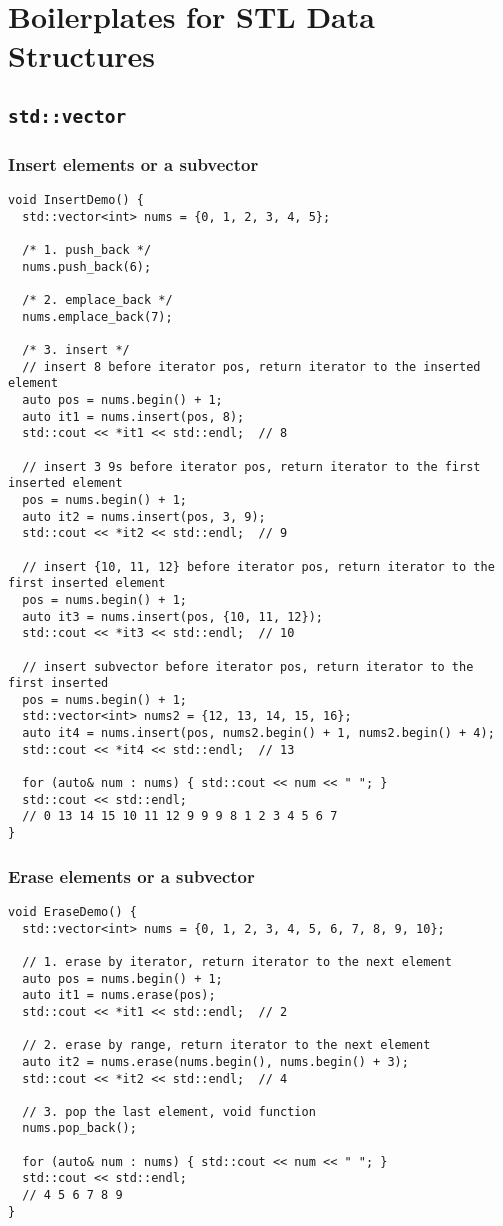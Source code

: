 \chapter{Boilerplates for STL Data Structures}
\section{{\colorbox{CodeBackground}{\lstinline|std::vector|}}}

\subsection{Insert elements or a subvector}
\begin{lstlisting}
void InsertDemo() {
  std::vector<int> nums = {0, 1, 2, 3, 4, 5};

  /* 1. push_back */
  nums.push_back(6);

  /* 2. emplace_back */
  nums.emplace_back(7);

  /* 3. insert */
  // insert 8 before iterator pos, return iterator to the inserted element
  auto pos = nums.begin() + 1;
  auto it1 = nums.insert(pos, 8);
  std::cout << *it1 << std::endl;  // 8

  // insert 3 9s before iterator pos, return iterator to the first inserted element
  pos = nums.begin() + 1;
  auto it2 = nums.insert(pos, 3, 9);
  std::cout << *it2 << std::endl;  // 9

  // insert {10, 11, 12} before iterator pos, return iterator to the first inserted element
  pos = nums.begin() + 1;
  auto it3 = nums.insert(pos, {10, 11, 12});
  std::cout << *it3 << std::endl;  // 10

  // insert subvector before iterator pos, return iterator to the first inserted
  pos = nums.begin() + 1;
  std::vector<int> nums2 = {12, 13, 14, 15, 16};
  auto it4 = nums.insert(pos, nums2.begin() + 1, nums2.begin() + 4);
  std::cout << *it4 << std::endl;  // 13

  for (auto& num : nums) { std::cout << num << " "; }
  std::cout << std::endl;
  // 0 13 14 15 10 11 12 9 9 9 8 1 2 3 4 5 6 7
}
\end{lstlisting}

\subsection{Erase elements or a subvector}
\begin{lstlisting}
void EraseDemo() {
  std::vector<int> nums = {0, 1, 2, 3, 4, 5, 6, 7, 8, 9, 10};

  // 1. erase by iterator, return iterator to the next element
  auto pos = nums.begin() + 1;
  auto it1 = nums.erase(pos);
  std::cout << *it1 << std::endl;  // 2

  // 2. erase by range, return iterator to the next element
  auto it2 = nums.erase(nums.begin(), nums.begin() + 3);
  std::cout << *it2 << std::endl;  // 4

  // 3. pop the last element, void function
  nums.pop_back();

  for (auto& num : nums) { std::cout << num << " "; }
  std::cout << std::endl;
  // 4 5 6 7 8 9
}
\end{lstlisting}

